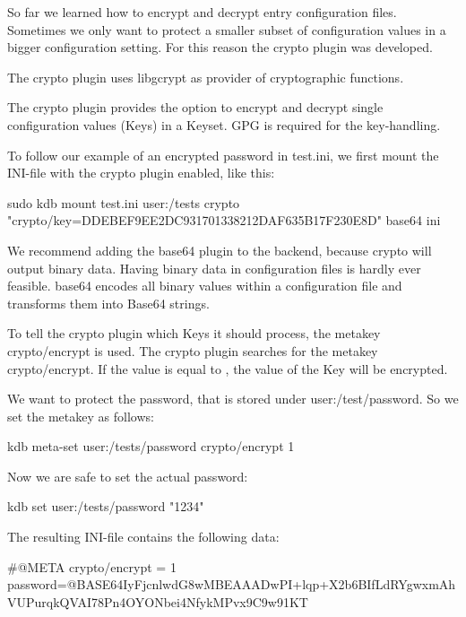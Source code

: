 So far we learned how to encrypt and decrypt entry configuration files. Sometimes we only want to protect a smaller subset of configuration values in a bigger configuration setting. For this reason the {\ttfamily crypto} plugin was developed.

The {\ttfamily crypto} plugin uses {\ttfamily libgcrypt} as provider of cryptographic functions.

The {\ttfamily crypto} plugin provides the option to encrypt and decrypt single configuration values (Keys) in a Keyset. G\+PG is required for the key-\/handling.

To follow our example of an encrypted password in {\ttfamily test.\+ini}, we first mount the I\+N\+I-\/file with the {\ttfamily crypto} plugin enabled, like this\+:


\begin{DoxyCode}
sudo kdb mount test.ini user:/tests crypto "crypto/key=DDEBEF9EE2DC931701338212DAF635B17F230E8D" base64 ini
\end{DoxyCode}


We recommend adding the {\ttfamily base64} plugin to the backend, because {\ttfamily crypto} will output binary data. Having binary data in configuration files is hardly ever feasible. {\ttfamily base64} encodes all binary values within a configuration file and transforms them into Base64 strings.

To tell the {\ttfamily crypto} plugin which Keys it should process, the metakey {\ttfamily crypto/encrypt} is used. The {\ttfamily crypto} plugin searches for the metakey {\ttfamily crypto/encrypt}. If the value is equal to {}, the value of the Key will be encrypted.

We want to protect the password, that is stored under {\ttfamily user\+:/test/password}. So we set the metakey as follows\+:


\begin{DoxyCode}
kdb meta-set user:/tests/password crypto/encrypt 1
\end{DoxyCode}


Now we are safe to set the actual password\+:


\begin{DoxyCode}
kdb set user:/tests/password "1234"
\end{DoxyCode}


The resulting I\+N\+I-\/file contains the following data\+:


\begin{DoxyCode}
#@META crypto/encrypt = 1
password=@BASE64IyFjcnlwdG8wMBEAAADwPI+lqp+X2b6BIfLdRYgwxmAhVUPurqkQVAI78Pn4OYONbei4NfykMPvx9C9w91KT
\end{DoxyCode}


